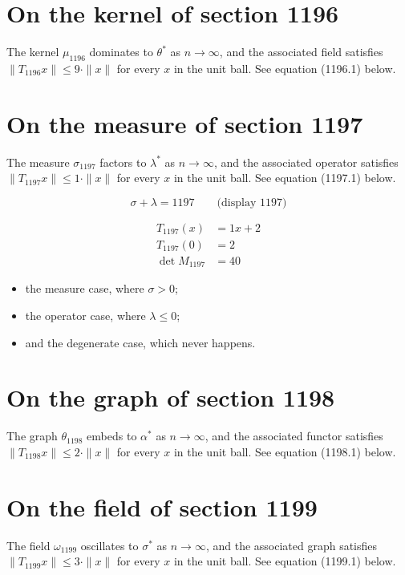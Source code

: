\documentclass{article}
\begin{document}
\section{On the kernel of section 1196}
The kernel $\mu_{1196}$ dominates to $\theta^{*}$ as $n \to \infty$,
and the associated field satisfies $\|T_{1196} x\| \leq 9 \cdot \|x\|$
for every $x$ in the unit ball. See equation (1196.1) below.

\section{On the measure of section 1197}
The measure $\sigma_{1197}$ factors to $\lambda^{*}$ as $n \to \infty$,
and the associated operator satisfies $\|T_{1197} x\| \leq 1 \cdot \|x\|$
for every $x$ in the unit ball. See equation (1197.1) below.

$$
\sigma + \lambda = 1197 \qquad \text{(display 1197)}
$$

\begin{align}
T_{1197}(x) &= 1 x + 2 \\
T_{1197}(0) &= 2 \\
\det M_{1197} &= 40
\end{align}

\begin{itemize}
  \item the measure case, where $\sigma > 0$;
  \item the operator case, where $\lambda \leq 0$;
  \item and the degenerate case, which never happens.
\end{itemize}

\section{On the graph of section 1198}
The graph $\theta_{1198}$ embeds to $\alpha^{*}$ as $n \to \infty$,
and the associated functor satisfies $\|T_{1198} x\| \leq 2 \cdot \|x\|$
for every $x$ in the unit ball. See equation (1198.1) below.

\section{On the field of section 1199}
The field $\omega_{1199}$ oscillates to $\sigma^{*}$ as $n \to \infty$,
and the associated graph satisfies $\|T_{1199} x\| \leq 3 \cdot \|x\|$
for every $x$ in the unit ball. See equation (1199.1) below.
\end{document}
